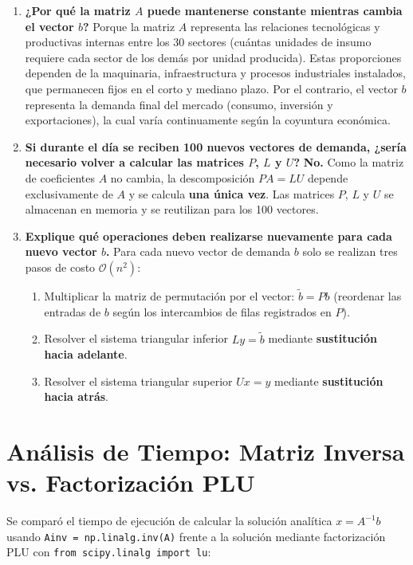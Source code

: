 \documentclass[11pt,a4paper]{article}
\begin{document}
\begin{enumerate}[leftmargin=*]
    \item \textbf{¿Por qué la matriz $A$ puede mantenerse constante mientras cambia el vector $b$?}
    Porque la matriz $A$ representa las relaciones tecnológicas y productivas internas entre los 30 sectores (cuántas unidades de insumo requiere cada sector de los demás por unidad producida). Estas proporciones dependen de la maquinaria, infraestructura y procesos industriales instalados, que permanecen fijos en el corto y mediano plazo. Por el contrario, el vector $b$ representa la demanda final del mercado (consumo, inversión y exportaciones), la cual varía continuamente según la coyuntura económica.

    \item \textbf{Si durante el día se reciben 100 nuevos vectores de demanda, ¿sería necesario volver a calcular las matrices $P$, $L$ y $U$?}
    \textbf{No.} Como la matriz de coeficientes $A$ no cambia, la descomposición $PA = LU$ depende exclusivamente de $A$ y se calcula \textbf{una única vez}. Las matrices $P$, $L$ y $U$ se almacenan en memoria y se reutilizan para los 100 vectores.

    \item \textbf{Explique qué operaciones deben realizarse nuevamente para cada nuevo vector $b$.}
    Para cada nuevo vector de demanda $b$ solo se realizan tres pasos de costo $\mathcal{O}(n^2)$:
    \begin{enumerate}
        \item Multiplicar la matriz de permutación por el vector: $\tilde{b} = P b$ (reordenar las entradas de $b$ según los intercambios de filas registrados en $P$).
        \item Resolver el sistema triangular inferior $Ly = \tilde{b}$ mediante \textbf{sustitución hacia adelante}.
        \item Resolver el sistema triangular superior $Ux = y$ mediante \textbf{sustitución hacia atrás}.
    \end{enumerate}
\end{enumerate}

\section{Análisis de Tiempo: Matriz Inversa vs. Factorización PLU}

Se comparó el tiempo de ejecución de calcular la solución analítica $x = A^{-1}b$ usando \texttt{Ainv = np.linalg.inv(A)} frente a la solución mediante factorización PLU con \texttt{from scipy.linalg import lu}:
\end{document}
